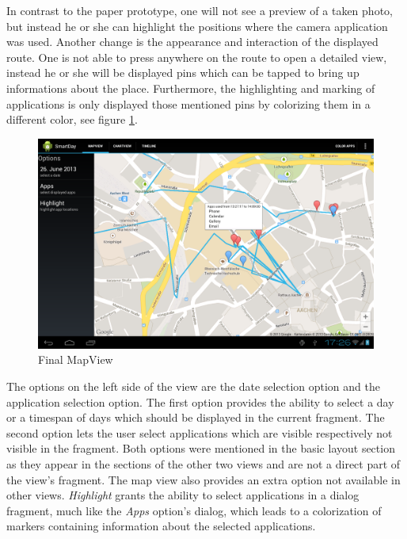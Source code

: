 In  contrast to the paper prototype, one will not see a preview of a taken photo, but instead he or she can highlight the positions where the camera application was used. Another change is the appearance and interaction of the displayed route. One is not able to press anywhere on the route to open a detailed view, instead he or she will be displayed pins which can be tapped to bring up informations about the place. Furthermore, the highlighting and marking of applications is only displayed those mentioned pins by colorizing them in a different color, see figure \ref{fig:mapview}.
\begin{figure}[h]
	\caption{Final MapView}
	\label{fig:mapview}
	\includegraphics[width=\textwidth]{images/Screenshots/vfinal/Screenshot_2013-08-26-17-20-18.png}
\end{figure}

The  options on the left side of the view are the date selection option and the application selection option. The first option provides the ability to select a day or a timespan of days which should be displayed in the current fragment. The second option lets the user select applications which are visible respectively not visible in the fragment. Both options were mentioned in the basic layout section as they appear in the sections of the other two views and are not a direct part of the view's  fragment.
The map view also provides an extra option not available in other views. \emph{Highlight} grants the ability to select applications in a dialog fragment, much like the \emph{Apps} option's dialog, which leads to a colorization of markers containing information about the selected applications.

